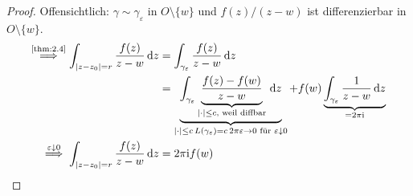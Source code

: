 \documentclass[a4paper,10pt]{scrbook}
\begin{document}
\begin{theorem}
\begin{proof}
    Offensichtlich: $\gamma \sim \gamma_\varepsilon$ in $O \setminus \{ w \}$ und $f(z)/(z-w)$ ist differenzierbar in $O \setminus \{ w \}$.
    \begin{align*}
      \overset{\text{\ref{thm:2.4}}}{\implies} \int_{|z-z_0| = r} \frac{f(z)}{z-w} \, \mathrm{d}z
      &= \int_{\gamma_\varepsilon} \frac{f(z)}{z-w} \, \mathrm{d}z \\
      &= \underbrace{\int_{\gamma_\varepsilon} \underbrace{\frac{f(z) - f(w)}{z-w}}_{|\cdot| \leq c \text{, weil diffbar}} \, \mathrm{d}z}_{|\cdot| \leq c \, L(\gamma_\varepsilon) = c \, 2 \pi \varepsilon \to 0 \text{ für } \varepsilon \downarrow 0}
      + f(w) \underbrace{\int_{\gamma_\varepsilon} \frac{1}{z-w} \, \mathrm{d}z}_{= 2 \pi \mathrm{i}} \\
      \overset{\varepsilon \downarrow 0}{\implies} \int_{|z-z_0| = r} \frac{f(z)}{z-w} \, \mathrm{d}z &= 2 \pi \mathrm{i} f(w)
    \end{align*}

  \end{proof}
\end{theorem}
\end{document}
